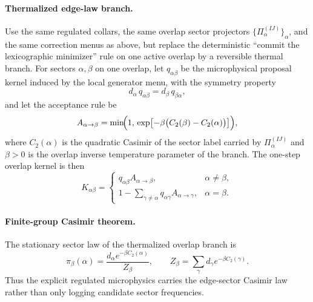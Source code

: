 \documentclass[11pt]{article}
\begin{document}
\paragraph{Thermalized edge-law branch.}
Use the same regulated collars, the same overlap sector projectors
$\{\Pi_\alpha^{(IJ)}\}_\alpha$, and the same correction menus as above, but replace the
deterministic ``commit the lexicographic minimizer'' rule on one active overlap by a reversible
thermal branch. For sectors $\alpha,\beta$ on one overlap, let $q_{\alpha\beta}$ be the
microphysical proposal kernel induced by the local generator menu, with the symmetry property
\begin{equation}
d_\alpha\,q_{\alpha\beta}=d_\beta\,q_{\beta\alpha},
\end{equation}
and let the acceptance rule be
\begin{equation}
A_{\alpha\to\beta}
=
\min\!\Bigl(
1,\,
\exp\bigl[-\beta\bigl(C_2(\beta)-C_2(\alpha)\bigr)\bigr]
\Bigr),
\end{equation}
where $C_2(\alpha)$ is the quadratic Casimir of the sector label carried by
$\Pi_\alpha^{(IJ)}$ and $\beta>0$ is the overlap inverse temperature parameter of the branch.
The one-step overlap kernel is then
\begin{equation}
K_{\alpha\beta}=
\begin{cases}
q_{\alpha\beta}A_{\alpha\to\beta}, & \alpha\neq \beta,\\[0.3em]
1-\sum_{\gamma\neq\alpha} q_{\alpha\gamma}A_{\alpha\to\gamma}, & \alpha=\beta.
\end{cases}
\end{equation}

\paragraph{Finite-group Casimir theorem.}
The stationary sector law of the thermalized overlap branch is
\begin{equation}
\pi_\beta(\alpha)
=
\frac{d_\alpha e^{-\beta C_2(\alpha)}}{Z_\beta},
\qquad
Z_\beta=\sum_\gamma d_\gamma e^{-\beta C_2(\gamma)}.
\end{equation}
Thus the explicit regulated microphysics carries the edge-sector Casimir law rather
than only logging candidate sector frequencies.
\end{document}
